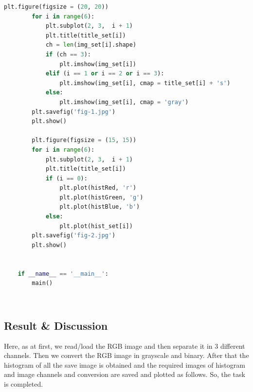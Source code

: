 \documentclass{article}
\begin{document}
{\begin{lstlisting}[language=Python, caption=Code for histogram and picture of different channels]
    	plt.figure(figsize = (20, 20))
    	for i in range(6):
    		plt.subplot(2, 3,  i + 1)
    		plt.title(title_set[i])
    		ch = len(img_set[i].shape)
    		if (ch == 3):
    			plt.imshow(img_set[i])
    		elif (i == 1 or i == 2 or i == 3):
    			plt.imshow(img_set[i], cmap = title_set[i] + 's')
    		else: 
    			plt.imshow(img_set[i], cmap = 'gray')			
    	plt.savefig('fig-1.jpg')
    	plt.show()
    	
    	plt.figure(figsize = (15, 15))
    	for i in range(6):
    		plt.subplot(2, 3,  i + 1)
    		plt.title(title_set[i])
    		if (i == 0):
    			plt.plot(histRed, 'r')
    			plt.plot(histGreen, 'g')
    			plt.plot(histBlue, 'b')
    		else:
    			plt.plot(hist_set[i])
    	plt.savefig('fig-2.jpg')
    	plt.show()
    	
    
    if __name__ == '__main__':
    	main()

    \end{lstlisting}
    \\
    \subsection{Result & Discussion}{
        Here, as at first, we read/load the RGB image and then separate it in 3 different channels. Then we convert the RGB image in grayscale and binary. After that the histogram of all the save image is obtained and the required images of histogram and image channels and conversion are saved and plotted as follows. So, the task is completed.
        
}}
\end{document}

